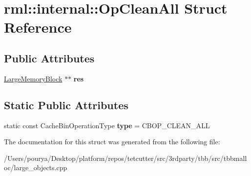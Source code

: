 \hypertarget{structrml_1_1internal_1_1OpCleanAll}{}\section{rml\+:\+:internal\+:\+:Op\+Clean\+All Struct Reference}
\label{structrml_1_1internal_1_1OpCleanAll}
\subsection*{Public Attributes}
\begin{DoxyCompactItemize}
\item 
\hypertarget{structrml_1_1internal_1_1OpCleanAll_aa133087dcb76a899a1027c85d9c3a420}{}\hyperlink{structrml_1_1internal_1_1LargeMemoryBlock}{Large\+Memory\+Block} $\ast$$\ast$ {\bfseries res}\label{structrml_1_1internal_1_1OpCleanAll_aa133087dcb76a899a1027c85d9c3a420}

\end{DoxyCompactItemize}
\subsection*{Static Public Attributes}
\begin{DoxyCompactItemize}
\item 
\hypertarget{structrml_1_1internal_1_1OpCleanAll_ae4e3e020a9d63ed08686a29e4d30187a}{}static const Cache\+Bin\+Operation\+Type {\bfseries type} = C\+B\+O\+P\+\_\+\+C\+L\+E\+A\+N\+\_\+\+A\+L\+L\label{structrml_1_1internal_1_1OpCleanAll_ae4e3e020a9d63ed08686a29e4d30187a}

\end{DoxyCompactItemize}


The documentation for this struct was generated from the following file\+:\begin{DoxyCompactItemize}
\item 
/\+Users/pourya/\+Desktop/platform/repos/tetcutter/src/3rdparty/tbb/src/tbbmalloc/large\+\_\+objects.\+cpp\end{DoxyCompactItemize}

